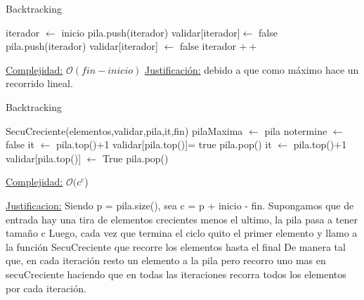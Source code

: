 \begin{algorithm}[H]
\caption{Backtracking}
  \begin{algorithmic}[1]
    \State iterador $\gets$ inicio
    \State {}
        \State pila.push(iterador)
          \State validar[iterador]$ \gets $ false
      \State \Else
        \State {}
          \State pila.push(iterador)
          \State validar[iterador] $ \gets $ false
          \EndIf
        \State iterador $ ++ $
      \EndIf
   \EndWhile
\end{algorithmic}

\underline{Complejidad:} $\mathcal{O}(fin-inicio )$\newline
\underline{Justificación:} debido a que como máximo hace un recorrido lineal.
\end{algorithm}


\begin{algorithm}[H]
\caption{Backtracking}
\begin{algorithmic}[1]
    \State
    \State {}
    \State {}
    \State SecuCreciente(elementos,validar,pila,it,fin)
    \State {}
	\State	pilaMaxima $\gets$ pila
	\EndIf
	    \State {}
	\State	notermine $\gets$ false
	\Else
    \State it $\gets$ pila.top()+1
    \State  validar[pila.top()]= true
    \State   pila.pop()
    \EndIf
    \State {}
    \State it $\gets$ pila.top()$+$1
    \State validar[pila.top()] $\gets$ True
    \State pila.pop()
    \EndIf
    \EndWhile
    \EndWhile
\end{algorithmic}
\underline{Complejidad:} $\mathcal{O}(c^c$)
\end{algorithm}

\underline{Justificacion:} Siendo p = pila.size(), sea c = p + inicio - fin. Supongamos que de entrada hay una tira de elementos crecientes menos el ultimo, la pila pasa a tener tamaño c
Luego, cada vez que termina el ciclo quito el primer elemento y llamo a la función SecuCreciente que recorre los elementos hasta el final
De manera tal que, en cada iteración resto un elemento a la pila pero recorro uno mas en secuCreciente haciendo que en todas las iteraciones recorra todos los elementos por cada iteración.




